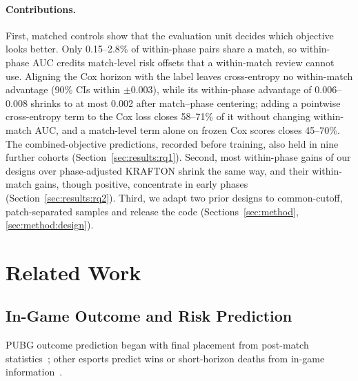\documentclass[sigconf,anonymous,nonacm]{acmart}
\begin{document}
\paragraph{Contributions.}
First, matched controls show that the evaluation unit decides which objective looks better. Only 0.15--2.8\% of within-phase pairs share a match, so within-phase AUC credits match-level risk offsets that a within-match review cannot use. Aligning the Cox horizon with the label leaves cross-entropy no within-match advantage (90\% CIs within $\pm0.003$), while its within-phase advantage of 0.006--0.008 shrinks to at most 0.002 after match--phase centering; adding a pointwise cross-entropy term to the Cox loss closes 58--71\% of it without changing within-match AUC, and a match-level term alone on frozen Cox scores closes 45--70\%. The combined-objective predictions, recorded before training, also held in nine further cohorts (Section~\ref{sec:results:rq1}). Second, most within-phase gains of our designs over phase-adjusted KRAFTON shrink the same way, and their within-match gains, though positive, concentrate in early phases (Section~\ref{sec:results:rq2}). Third, we adapt two prior designs to common-cutoff, patch-separated samples and release the code (Sections~\ref{sec:method}, \ref{sec:method:design}).

\section{Related Work}
\label{sec:related}

\subsection{In-Game Outcome and Risk Prediction}
\label{sec:related:esports}
PUBG outcome prediction began with final placement from post-match statistics~\cite{KagglePUBG,LeeLee25}; other esports predict wins or short-horizon deaths from in-game information~\cite{Hodge21,Katona19,Marshall22}.
\end{document}
